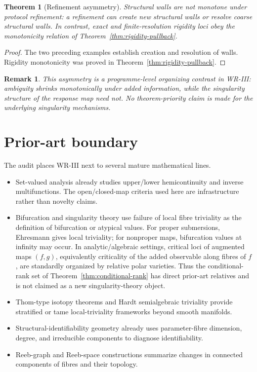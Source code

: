 \documentclass[11pt]{article}
\newtheorem{theorem}[definition]{Theorem}
\newtheorem{remark}[definition]{Remark}
\begin{document}
\begin{theorem}[Refinement asymmetry]
Structural walls are not monotone under protocol refinement: a refinement can
create new structural walls or resolve coarse structural walls. In contrast,
exact and finite-resolution rigidity loci obey the monotonicity relation of
Theorem~\ref{thm:rigidity-pullback}.
\end{theorem}

\begin{proof}
The two preceding examples establish creation and resolution of walls.
Rigidity monotonicity was proved in Theorem~\ref{thm:rigidity-pullback}.
\end{proof}

\begin{remark}
This asymmetry is a programme-level organizing contrast in WR-III: ambiguity
shrinks monotonically under added information, while the singularity structure
of the response map need not. No theorem-priority claim is made for the
underlying singularity mechanisms.
\end{remark}

\section{Prior-art boundary}

The audit places WR-III next to several mature mathematical lines.

\begin{itemize}
\item Set-valued analysis already studies upper/lower hemicontinuity and
inverse multifunctions. The open/closed-map criteria used here are
infrastructure rather than novelty claims.

\item Bifurcation and singularity theory use failure of local fibre
triviality as the definition of bifurcation or atypical values. For proper
submersions, Ehresmann gives local triviality; for nonproper maps, bifurcation
values at infinity may occur. In analytic/algebraic settings, critical loci of
augmented maps \((f,g)\), equivalently criticality of the added observable
along fibres of \(f\), are standardly organized by relative polar varieties.
Thus the conditional-rank set of Theorem~\ref{thm:conditional-rank} has direct
prior-art relatives and is not claimed as a new singularity-theory object.

\item Thom-type isotopy theorems and Hardt semialgebraic triviality provide
stratified or tame local-triviality frameworks beyond smooth manifolds.

\item Structural-identifiability geometry already uses parameter-fibre
dimension, degree, and irreducible components to diagnose identifiability.

\item Reeb-graph and Reeb-space constructions summarize changes in connected
components of fibres and their topology.
\end{itemize}
\end{document}
